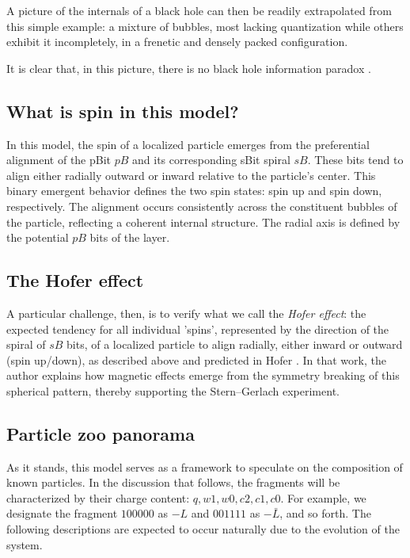 \documentclass[12pt,english]{article}
\begin{document}
A picture of the internals of a black hole can then be readily extrapolated from this simple example: a mixture of bubbles, most lacking quantization while others exhibit it incompletely, in a frenetic and densely packed configuration.

It is clear that, in this picture, there is no black hole information paradox \cite{hawking1976breakdown,harlow2016jerusalem}.

\subsection{What is spin in this model?}
In this model, the spin of a localized particle emerges from the preferential alignment of the pBit \( pB \) and its corresponding sBit spiral \( sB \). These bits tend to align either radially outward or inward relative to the particle’s center. This binary emergent behavior defines the two spin states: spin up and spin down, respectively. The alignment occurs consistently across the constituent bubbles of the particle, reflecting a coherent internal structure. The radial axis is defined by the potential $pB$ bits of the layer.

\subsection{The Hofer effect}

A particular challenge, then, is to verify what we call the \emph{Hofer effect}: the expected tendency for all individual 'spins', represented by the direction of the spiral of $sB$ bits, of a localized particle to align radially, either inward or outward (spin up/down), as described above and predicted in Hofer \cite{hofer}. In that work, the author explains how magnetic effects emerge from the symmetry breaking of this spherical pattern, thereby supporting the Stern–Gerlach experiment.

\subsection{Particle zoo panorama}
As it stands, this model serves as a framework to speculate on the composition of known particles. In the discussion that follows, the fragments will be characterized by their charge content: \(q, w1, w0, c2, c1, c0\). For example, we designate the fragment \(100000\) as \(-L\) and \(001111\) as \(-\bar{L}\), and so forth. The following descriptions are expected to occur naturally due to the evolution of the system.
\end{document}
